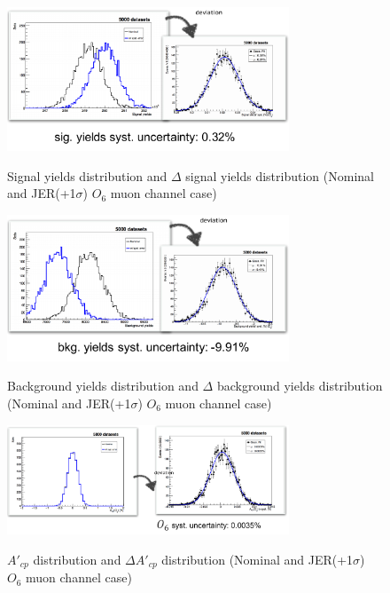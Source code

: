 		\begin{figure}[H]
		\centering
		    \includegraphics[width=0.75\textwidth]{Figures/SystUnc/sig_yields_unc.pdf}\\
		\caption{Signal yields distribution and $\Delta$ signal yields distribution (Nominal and JER(+1$\sigma$) $O_6$ muon channel case) }
		\label{Syst:fig:deviation_sig}
		\end{figure}
		\FloatBarrier

		\begin{figure}[H]
		\centering
		    \includegraphics[width=0.75\textwidth]{Figures/SystUnc/bkg_yields_unc.pdf}\\
		\caption{Background yields distribution and $\Delta$ background yields distribution (Nominal and JER(+1$\sigma$) $O_6$ muon channel case) }
		\label{Syst:fig:deviation_bkg}
		\end{figure}
		\FloatBarrier

		\begin{figure}[H]
		\centering
		    \includegraphics[width=0.75\textwidth]{Figures/SystUnc/Acp_unc.pdf}\\
		\caption{$A'_{cp}$ distribution and $\Delta A'_{cp}$ distribution (Nominal and JER(+1$\sigma$) $O_6$ muon channel case) }
		\label{Syst:fig:deviation_Acp}
		\end{figure}
		\FloatBarrier

